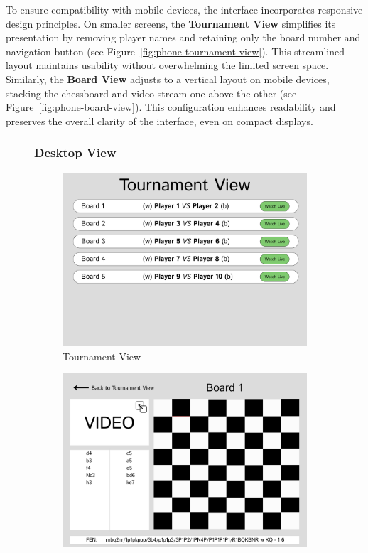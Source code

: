 To ensure compatibility with mobile devices, the interface incorporates responsive design principles. On smaller screens, the \textbf{Tournament View} simplifies its presentation by removing player names and retaining only the board number and navigation button (see Figure~\ref{fig:phone-tournament-view}). This streamlined layout maintains usability without overwhelming the limited screen space.
Similarly, the \textbf{Board View} adjusts to a vertical layout on mobile devices, stacking the chessboard and video stream one above the other (see Figure~\ref{fig:phone-board-view}). This configuration enhances readability and preserves the overall clarity of the interface, even on compact displays.


\begin{figure}[h!]
\subsubsection*{Desktop View}
    \centering
    \begin{subfigure}[h!]{0.40\linewidth}
        \centering
        \includegraphics[width=\linewidth]{figures/methods/wireframes/desktop-tournament-view.png}
        \caption{Tournament View}
        \label{fig:desktop-tournament-view}
    \end{subfigure}
    \hfill
    \begin{subfigure}[h!]{0.40\linewidth}
        \centering
        \includegraphics[width=\linewidth]{figures/methods/wireframes/desktop-board-view.png}

\end{subfigure}
\end{figure}
